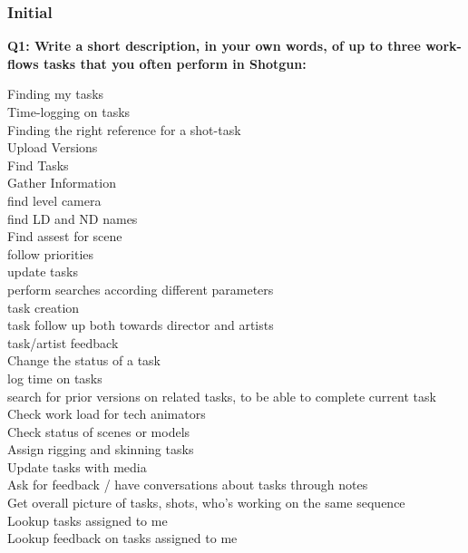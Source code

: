    \subsubsection{Initial}
      \label{subsec:ref_subsec_results_initial}
      \textbf{Q1: Write a short description, in your own words, of up to three
        work-flows tasks that you often perform in Shotgun:} \\
      \begin{adjustwidth}{0.3cm}{}
        Finding my tasks\\
        Time-logging on tasks\\
        Finding the right reference for a shot-task\\
        Upload Versions\\
        Find Tasks\\
        Gather Information\\
        find level camera\\
        find LD and ND names\\
        Find assest for scene\\
        follow priorities\\
        update tasks\\
        perform searches according different parameters\\
        task creation\\
        task follow up both towards director and artists\\
        task/artist feedback\\
        Change the status of a task\\
        log time on tasks\\
        search for prior versions on related tasks, to be able to complete current task\\
        Check work load for tech animators\\
        Check status of scenes or models\\
        Assign rigging and skinning tasks\\
        Update tasks with media\\
        Ask for feedback / have conversations about tasks through notes\\
        Get overall picture of tasks, shots, who's working on the same sequence\\
        Lookup tasks assigned to me\\
        Lookup feedback on tasks assigned to me\\

\end{adjustwidth}
